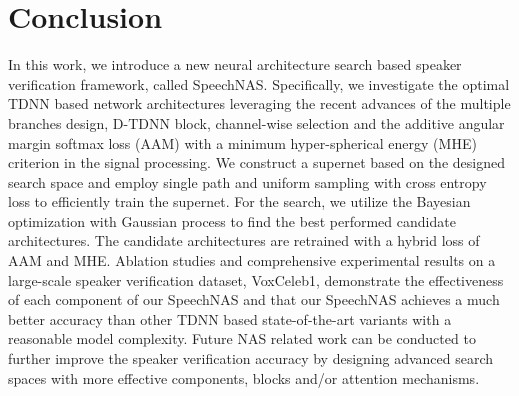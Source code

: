 \documentclass{article}
\begin{document}
\section{Conclusion}\label{sec:conclu}
In this work, we introduce a new neural architecture search based speaker verification framework, called SpeechNAS. Specifically, we investigate the optimal TDNN based network architectures leveraging the recent advances of the multiple branches design, D-TDNN block, channel-wise selection and the additive angular margin softmax loss (AAM) with a minimum hyper-spherical energy (MHE) criterion in the signal processing. We construct a supernet based on the designed search space and employ single path and uniform sampling with cross entropy loss to efficiently train the supernet. For the search, we utilize the Bayesian optimization with Gaussian process to find the best performed candidate architectures. The candidate architectures are retrained with a hybrid loss of AAM and MHE. Ablation studies and comprehensive experimental results on a large-scale speaker verification dataset, {\selectfont VoxCeleb1}, demonstrate the effectiveness of each component of our SpeechNAS and that our SpeechNAS achieves a much better accuracy than other TDNN based state-of-the-art variants with a reasonable model complexity. Future NAS related work can be conducted to further improve the speaker verification accuracy by designing advanced search spaces with more effective components, blocks and/or attention mechanisms.

































































{\small

  }
\end{document}
